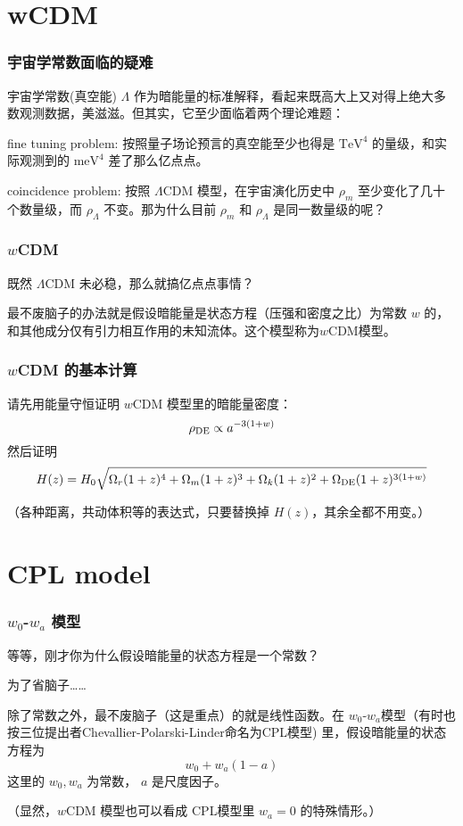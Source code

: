 \documentclass[CJK,13pt]{beamer}
\date{}
\begin{document}
  \bch

  \section{wCDM}

  \begin{frame}
    \frametitle{宇宙学常数面临的疑难}
    宇宙学常数(真空能) $\Lambda$ 作为暗能量的标准解释，看起来既高大上又对得上绝大多数观测数据，美滋滋。但其实，它至少面临着两个理论难题：
    \bitem
  \item{{\blue fine tuning problem:} 按照量子场论预言的真空能至少也得是 $\mathrm{TeV}^4$ 的量级，和实际观测到的 $\mathrm{meV}^4$ 差了那么亿点点。}
  \item{{\blue coincidence problem:} 按照 $\Lambda$CDM 模型，在宇宙演化历史中 $\rho_m$ 至少变化了几十个数量级，而 $\rho_\Lambda$ 不变。那为什么目前 $\rho_m$ 和 $\rho_\Lambda$ 是同一数量级的呢？}
    \eitem
  \end{frame}

  \begin{frame}
    \frametitle{$w$CDM}
    既然 $\Lambda$CDM 未必稳，那么就搞亿点点事情？


    最不废脑子的办法就是假设暗能量是状态方程（压强和密度之比）为常数 $w$ 的，和其他成分仅有引力相互作用的未知流体。这个模型称为{\blue $w$CDM模型}。
  \end{frame}

  \begin{frame}
    \frametitle{$w$CDM 的基本计算}
    请先用能量守恒证明 $w$CDM 模型里的暗能量密度：
    $$\rho_{\rm DE} \propto a^{-3(1+w)}$$
    然后证明
   {\small $$H(z)=H_0\sqrt{\Omega_r(1+z)^4+\Omega_m(1+z)^3 + \Omega_k(1+z)^2+\Omega_{\rm DE}(1+z)^{3(1+w)}}$$}

    \skiplines
    
    （各种距离，共动体积等的表达式，只要替换掉 $H(z)$，其余全都不用变。）
  \end{frame}

  \section{CPL model}
  
  \begin{frame}
    \frametitle{$w_0$-$w_a$ 模型}
    等等，刚才你为什么假设暗能量的状态方程是一个常数？
    
     为了省脑子……

    \skiplines
    
    除了常数之外，最不废脑子（这是重点）的就是线性函数。在 $w_0$-$w_a$模型（有时也按三位提出者Chevallier-Polarski-Linder命名为CPL模型) 里，假设暗能量的状态方程为
    $$w_0+w_a(1-a)$$
      这里的 $w_0, w_a$ 为常数， $a$ 是尺度因子。

      \skipline
      
      （显然，$w$CDM 模型也可以看成 CPL模型里 $w_a=0$ 的特殊情形。）
  \end{frame}
\end{document}
